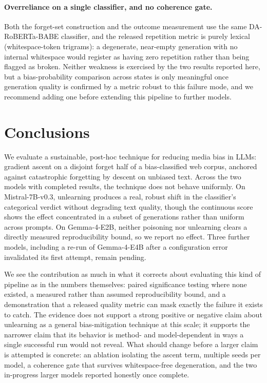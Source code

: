 \documentclass[runningheads]{llncs}
\begin{document}
\paragraph{Overreliance on a single classifier, and no coherence gate.} Both the forget-set construction and the outcome measurement use the same DA-RoBERTa-BABE classifier, and the released repetition metric is purely lexical (whitespace-token trigrams): a degenerate, near-empty generation with no internal whitespace would register as having zero repetition rather than being flagged as broken. Neither weakness is exercised by the two results reported here, but a bias-probability comparison across states is only meaningful once generation quality is confirmed by a metric robust to this failure mode, and we recommend adding one before extending this pipeline to further models.

\section{Conclusions}
We evaluate a sustainable, post-hoc technique for reducing media bias in LLMs: gradient ascent on a disjoint forget half of a bias-classified web corpus, anchored against catastrophic forgetting by descent on unbiased text. Across the two models with completed results, the technique does not behave uniformly. On Mistral-7B-v0.3, unlearning produces a real, robust shift in the classifier's categorical verdict without degrading text quality, though the continuous score shows the effect concentrated in a subset of generations rather than uniform across prompts. On Gemma-4-E2B, neither poisoning nor unlearning clears a directly measured reproducibility bound, so we report no effect. Three further models, including a re-run of Gemma-4-E4B after a configuration error invalidated its first attempt, remain pending.

We see the contribution as much in what it corrects about evaluating this kind of pipeline as in the numbers themselves: paired significance testing where none existed, a measured rather than assumed reproducibility bound, and a demonstration that a released quality metric can mask exactly the failure it exists to catch. The evidence does not support a strong positive or negative claim about unlearning as a general bias-mitigation technique at this scale; it supports the narrower claim that its behavior is method- and model-dependent in ways a single successful run would not reveal. What should change before a larger claim is attempted is concrete: an ablation isolating the ascent term, multiple seeds per model, a coherence gate that survives whitespace-free degeneration, and the two in-progress larger models reported honestly once complete.



\end{document}
